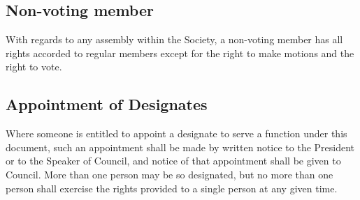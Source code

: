 \subsection{Non-voting member}
With regards to any assembly within the Society, a non-voting member has all
rights accorded to regular members except for the right to make motions and
the right to vote.

\subsection{Appointment of Designates}

Where someone is entitled to appoint a designate to serve a function
under this document, such an appointment shall be made by written notice to
the President or to the Speaker of Council, and notice of that appointment
shall be given to Council. More than one person may be so designated, but no
more than one person shall exercise the rights provided to a single person at
any given time.
